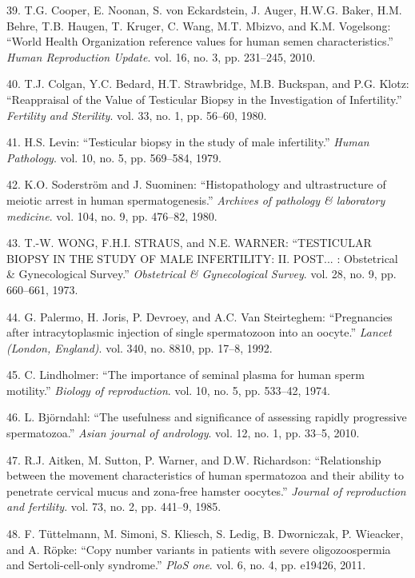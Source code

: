 \documentclass[12pt,twoside]{ugathesis}
\theoremstyle{definition}
\theoremstyle{definition}
\theoremstyle{remark}
\begin{document}
\hypertarget{ref-Cooper2010}{}
39. T.G. Cooper, E. Noonan, S. von Eckardstein, J. Auger, H.W.G. Baker,
H.M. Behre, T.B. Haugen, T. Kruger, C. Wang, M.T. Mbizvo, and K.M.
Vogelsong: ``World Health Organization reference values for human semen
characteristics.'' \emph{Human Reproduction Update}. vol. 16, no. 3, pp.
231--245, 2010.

\hypertarget{ref-Colgan1980}{}
40. T.J. Colgan, Y.C. Bedard, H.T. Strawbridge, M.B. Buckspan, and P.G.
Klotz: ``Reappraisal of the Value of Testicular Biopsy in the
Investigation of Infertility.'' \emph{Fertility and Sterility}. vol. 33,
no. 1, pp. 56--60, 1980.

\hypertarget{ref-Levin1979}{}
41. H.S. Levin: ``Testicular biopsy in the study of male infertility.''
\emph{Human Pathology}. vol. 10, no. 5, pp. 569--584, 1979.

\hypertarget{ref-Soderstrom1980}{}
42. K.O. Soderström and J. Suominen: ``Histopathology and ultrastructure
of meiotic arrest in human spermatogenesis.'' \emph{Archives of
pathology \& laboratory medicine}. vol. 104, no. 9, pp. 476--82, 1980.

\hypertarget{ref-WONG1973}{}
43. T.-W. WONG, F.H.I. STRAUS, and N.E. WARNER: ``TESTICULAR BIOPSY IN
THE STUDY OF MALE INFERTILITY: II. POST... : Obstetrical \&
Gynecological Survey.'' \emph{Obstetrical \& Gynecological Survey}. vol.
28, no. 9, pp. 660--661, 1973.

\hypertarget{ref-Palermo1992}{}
44. G. Palermo, H. Joris, P. Devroey, and A.C. Van Steirteghem:
``Pregnancies after intracytoplasmic injection of single spermatozoon
into an oocyte.'' \emph{Lancet (London, England)}. vol. 340, no. 8810,
pp. 17--8, 1992.

\hypertarget{ref-Lindholmer1974}{}
45. C. Lindholmer: ``The importance of seminal plasma for human sperm
motility.'' \emph{Biology of reproduction}. vol. 10, no. 5, pp. 533--42,
1974.

\hypertarget{ref-Bjorndahl2010}{}
46. L. Björndahl: ``The usefulness and significance of assessing rapidly
progressive spermatozoa.'' \emph{Asian journal of andrology}. vol. 12,
no. 1, pp. 33--5, 2010.

\hypertarget{ref-Aitken1985}{}
47. R.J. Aitken, M. Sutton, P. Warner, and D.W. Richardson:
``Relationship between the movement characteristics of human spermatozoa
and their ability to penetrate cervical mucus and zona-free hamster
oocytes.'' \emph{Journal of reproduction and fertility}. vol. 73, no. 2,
pp. 441--9, 1985.

\hypertarget{ref-Tuttelmann2011}{}
48. F. Tüttelmann, M. Simoni, S. Kliesch, S. Ledig, B. Dworniczak, P.
Wieacker, and A. Röpke: ``Copy number variants in patients with severe
oligozoospermia and Sertoli-cell-only syndrome.'' \emph{PloS one}. vol.
6, no. 4, pp. e19426, 2011.
\end{document}

